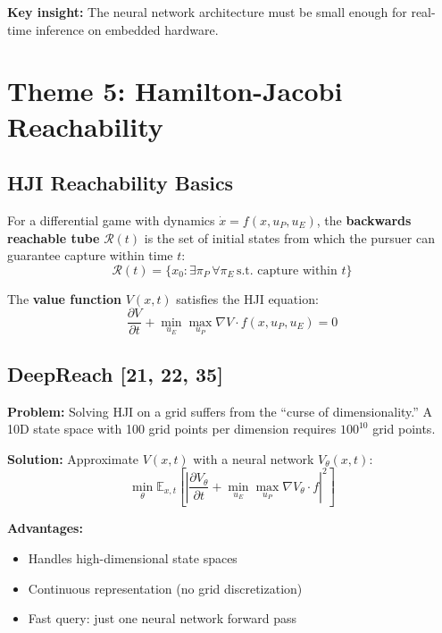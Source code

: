 \documentclass[11pt,a4paper]{report}
\begin{document}
\textbf{Key insight:} The neural network architecture must be small enough for real-time inference on embedded hardware.

\section{Theme 5: Hamilton-Jacobi Reachability}

\subsection{HJI Reachability Basics}

For a differential game with dynamics $\dot{x} = f(x, u_P, u_E)$, the \textbf{backwards reachable tube} $\mathcal{R}(t)$ is the set of initial states from which the pursuer can guarantee capture within time $t$:
\begin{equation}
    \mathcal{R}(t) = \{x_0 : \exists \pi_P \, \forall \pi_E \, \text{s.t. capture within } t\}
\end{equation}

The \textbf{value function} $V(x,t)$ satisfies the HJI equation:
\begin{equation}
    \frac{\partial V}{\partial t} + \min_{u_E} \max_{u_P} \nabla V \cdot f(x, u_P, u_E) = 0
\end{equation}

\subsection{DeepReach [21, 22, 35]}

\textbf{Problem:} Solving HJI on a grid suffers from the ``curse of dimensionality.'' A 10D state space with 100 grid points per dimension requires $100^{10}$ grid points.

\textbf{Solution:} Approximate $V(x,t)$ with a neural network $V_\theta(x,t)$:
\begin{equation}
    \min_\theta \mathbb{E}_{x,t}\left[ \left| \frac{\partial V_\theta}{\partial t} + \min_{u_E} \max_{u_P} \nabla V_\theta \cdot f \right|^2 \right]
\end{equation}

\textbf{Advantages:}
\begin{itemize}
    \item Handles high-dimensional state spaces
    \item Continuous representation (no grid discretization)
    \item Fast query: just one neural network forward pass
\end{itemize}
\end{document}
